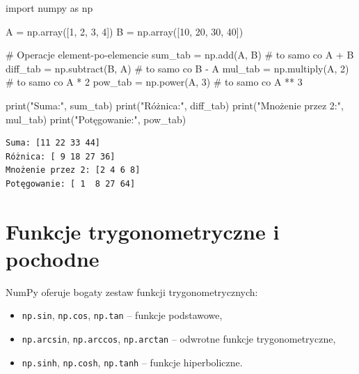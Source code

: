 \documentclass[
  polish,
  letterpaper,
  DIV=11,
  numbers=noendperiod]{scrreprt}
\newenvironment{Shaded}{\begin{snugshade}}{\end{snugshade}}
\newcommand{\BuiltInTok}[1]{\textcolor[rgb]{0.00,0.23,0.31}{#1}}
\newcommand{\CommentTok}[1]{\textcolor[rgb]{0.37,0.37,0.37}{#1}}
\newcommand{\DecValTok}[1]{\textcolor[rgb]{0.68,0.00,0.00}{#1}}
\newcommand{\ImportTok}[1]{\textcolor[rgb]{0.00,0.46,0.62}{#1}}
\newcommand{\NormalTok}[1]{\textcolor[rgb]{0.00,0.23,0.31}{#1}}
\newcommand{\OperatorTok}[1]{\textcolor[rgb]{0.37,0.37,0.37}{#1}}
\newcommand{\StringTok}[1]{\textcolor[rgb]{0.13,0.47,0.30}{#1}}
\providecommand{\tightlist}{%
  \setlength{\itemsep}{0pt}\setlength{\parskip}{0pt}}
\begin{document}
\begin{Shaded}
\begin{Highlighting}[]
\ImportTok{import}\NormalTok{ numpy }\ImportTok{as}\NormalTok{ np}

\NormalTok{A }\OperatorTok{=}\NormalTok{ np.array([}\DecValTok{1}\NormalTok{, }\DecValTok{2}\NormalTok{, }\DecValTok{3}\NormalTok{, }\DecValTok{4}\NormalTok{])}
\NormalTok{B }\OperatorTok{=}\NormalTok{ np.array([}\DecValTok{10}\NormalTok{, }\DecValTok{20}\NormalTok{, }\DecValTok{30}\NormalTok{, }\DecValTok{40}\NormalTok{])}

\CommentTok{\# Operacje element{-}po{-}elemencie}
\NormalTok{sum\_tab }\OperatorTok{=}\NormalTok{ np.add(A, B)       }\CommentTok{\# to samo co A + B}
\NormalTok{diff\_tab }\OperatorTok{=}\NormalTok{ np.subtract(B, A) }\CommentTok{\# to samo co B {-} A}
\NormalTok{mul\_tab }\OperatorTok{=}\NormalTok{ np.multiply(A, }\DecValTok{2}\NormalTok{)  }\CommentTok{\# to samo co A * 2}
\NormalTok{pow\_tab }\OperatorTok{=}\NormalTok{ np.power(A, }\DecValTok{3}\NormalTok{)     }\CommentTok{\# to samo co A ** 3}

\BuiltInTok{print}\NormalTok{(}\StringTok{"Suma:"}\NormalTok{, sum\_tab)}
\BuiltInTok{print}\NormalTok{(}\StringTok{"Różnica:"}\NormalTok{, diff\_tab)}
\BuiltInTok{print}\NormalTok{(}\StringTok{"Mnożenie przez 2:"}\NormalTok{, mul\_tab)}
\BuiltInTok{print}\NormalTok{(}\StringTok{"Potęgowanie:"}\NormalTok{, pow\_tab)}
\end{Highlighting}
\end{Shaded}

\begin{verbatim}
Suma: [11 22 33 44]
Różnica: [ 9 18 27 36]
Mnożenie przez 2: [2 4 6 8]
Potęgowanie: [ 1  8 27 64]
\end{verbatim}

\section{Funkcje trygonometryczne i
pochodne}\label{funkcje-trygonometryczne-i-pochodne}

NumPy oferuje bogaty zestaw funkcji trygonometrycznych:

\begin{itemize}
\tightlist
\item
  \texttt{np.sin}, \texttt{np.cos}, \texttt{np.tan} -- funkcje
  podstawowe,
\item
  \texttt{np.arcsin}, \texttt{np.arccos}, \texttt{np.arctan} -- odwrotne
  funkcje trygonometryczne,
\item
  \texttt{np.sinh}, \texttt{np.cosh}, \texttt{np.tanh} -- funkcje
  hiperboliczne.
\end{itemize}
\end{document}
